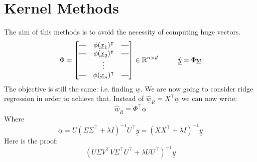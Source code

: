 \section{Kernel Methods}
The aim of this methods is to avoid the necessity of computing huge vectors.
\[
    \Phi =  \begin{bmatrix}
        \horzbar & \phi(\underline{x}_1)^\intercal & \horzbar\\
        \horzbar & \phi(\underline{x}_2)^\intercal & \horzbar\\    
         & \vdots & \\
        \horzbar & \phi(\underline{x}_n)^\intercal & \horzbar
    \end{bmatrix}
    \in \mathbb{R}^{n \times d} \hspace{1cm} \underline{\hat{y}} = \Phi \underline{w}
\]
The objective is still the same: i.e. finding $\underline{w}$. We are now going to consider ridge regression in order to achieve that. 
Instead of $\underline{\hat{w}}_R = X^\intercal \underline{\alpha}$ we can now write:
\[
    \underline{\hat{w}}_R = \Phi^\intercal \underline{\alpha}
\]
Where
\[
    \underline{\alpha} = U(\Sigma \Sigma^\intercal + \lambda I)^{-1} U^\intercal \underline{y} = (XX^\intercal + \lambda I)^{-1} \underline{y}    
\]
Here is the proof:
\[
    (U\Sigma V^\intercal V\Sigma^\intercal U^\intercal + \lambda UU^\intercal)^{-1} \underline{y}    
\]